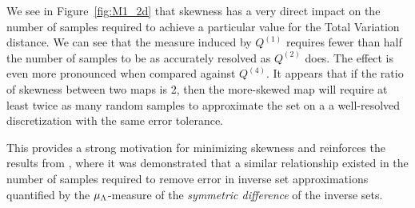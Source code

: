 We see in Figure~\ref{fig:M1_2d} that skewness has a very direct impact on the number of samples required to achieve a particular value for the Total Variation distance.
We can see that the measure induced by $Q^{(1)}$ requires fewer than half the number of samples to be as accurately resolved as $Q^{(2)}$ does.
The effect is even more pronounced when compared against $Q^{(4)}$.
It appears that if the ratio of skewness between two maps is 2, then the more-skewed map will require at least twice as many random samples to approximate the set on a a well-resolved discretization with the same error tolerance.

This provides a strong motivation for minimizing skewness and reinforces the results from \cite{BPW_2015}, where it was demonstrated that a similar relationship existed in the number of samples required to remove error in inverse set approximations quantified by the $\mu_{\Lambda}$-measure of the {\em symmetric difference} of the inverse sets.
